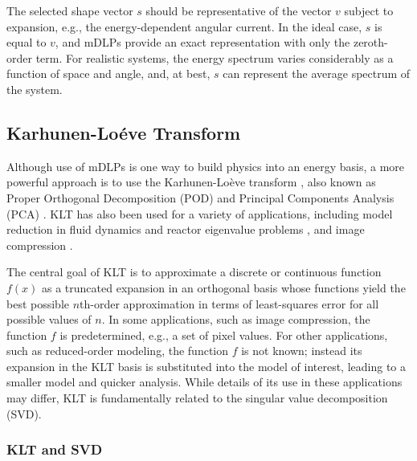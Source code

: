 \documentclass[5p,times,twocolumn,10pt]{elsarticle}
\begin{document}
    The selected shape vector $s$ should be representative of the vector $v$
    subject to expansion, e.g., the energy-dependent angular current.
    In the ideal case, $s$ is equal to $v$, and mDLPs provide an exact
    representation with only the zeroth-order term.
    For realistic systems, the energy spectrum varies considerably as
    a function of space and angle, and, at best, $s$ can represent the
    average spectrum of the system.

    \subsection{Karhunen-Lo\'{e}ve Transform}

    Although use of mDLPs is one way to build physics into
    an energy basis, a more powerful approach is to use
    the Karhunen-Lo\`{e}ve transform \cite{Dony2001}, also
    known as Proper Orthogonal Decomposition (POD) \cite{Buchan2013}
    and Principal Components Analysis (PCA) \cite{Dony2001}.  KLT has also been
    used for a variety of applications, including model reduction in fluid
    dynamics \cite{Sirovich1987} and reactor eigenvalue problems
    \cite{Buchan2013}, and image compression \cite{Dony2001}.

    The central goal of KLT is to approximate a discrete or continuous function
    $f(x)$ as a truncated expansion in an orthogonal basis whose functions
    yield the best possible $n$th-order approximation in terms of least-squares
    error for all possible values of $n$.  In some applications, such as image
    compression, the function $f$ is predetermined, e.g., a set of pixel values.
    For other applications, such as reduced-order modeling, the function $f$ is
    not known; instead its expansion in the KLT basis is substituted into the
    model of interest, leading to a smaller model and quicker analysis. While
    details of its use in these applications may differ, KLT is fundamentally
    related to the singular value decomposition (SVD).

    \subsubsection{KLT and SVD}
\end{document}
